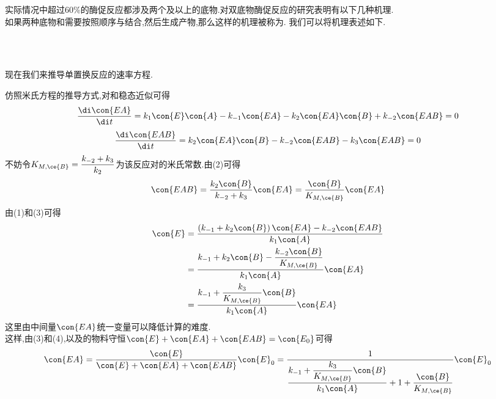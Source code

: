 \documentclass{ctexart}
\begin{document}
\indent 实际情况中超过60\%的酶促反应都涉及两个及以上的底物.对双底物酶促反应的研究表明有以下几种机理.\\
\indent 如果两种底物和需要按照顺序与结合,然后生成产物,那么这样的机理被称为.%
我们可以将机理表述如下.
\begin{tightcenter}
    \\
    \\
\end{tightcenter}
现在我们来推导单置换反应的速率方程.
\begin{derivation}\setcounter{equation}{0}
    仿照米氏方程的推导方式,对和稳态近似可得
    \begin{equation}
        \dfrac{\di\con{EA}}{\di t}=k_1\con{E}\con{A}-k_{-1}\con{EA}-k_2\con{EA}\con{B}+k_{-2}\con{EAB}=0
    \end{equation}
    \begin{equation}
        \dfrac{\di\con{EAB}}{\di t}=k_2\con{EA}\con{B}-k_{-2}\con{EAB}-k_3\con{EAB}=0
    \end{equation}
    不妨令$K_{M,\ce{B}}=\dfrac{k_{-2}+k_3}{k_2}$为该反应对的米氏常数.由(2)可得
    \begin{equation}
        \con{EAB}=\dfrac{k_2\con{B}}{k_{-2}+k_3}\con{EA}=\dfrac{\con{B}}{K_{M,\ce{B}}}\con{EA}
    \end{equation}
    由(1)和(3)可得
    \begin{equation}
        \begin{aligned}
            \con{E}
            &= \dfrac{\left(k_{-1}+k_2\con{B}\right)\con{EA}-k_{-2}\con{EAB}}{k_1\con{A}} \\
            &= \dfrac{k_{-1}+k_2\con{B}-\dfrac{k_{-2}\con{B}}{K_{M,\ce{B}}}}{k_1\con{A}}\con{EA} \\
            &= \dfrac{k_{-1}+\dfrac{k_3}{K_{M,\ce{B}}}\con{B}}{k_1\con{A}}\con{EA}
        \end{aligned}
    \end{equation}
    这里由中间量$\con{EA}$统一变量可以降低计算的难度.\\
    这样,由(3)和(4),以及的物料守恒$\con{E}+\con{EA}+\con{EAB}=\con{E_0}$可得
    \begin{equation}
        \con{EA}
        =\dfrac{\con{E}}{\con{E}+\con{EA}+\con{EAB}}\con{E}_0
        =\dfrac{1}{\dfrac{k_{-1}+\dfrac{k_3}{K_{M,\ce{B}}}\con{B}}{k_1\con{A}}+1+\dfrac{\con{B}}{K_{M,\ce{B}}}}\con{E}_0

\end{equation}
\end{derivation}
\end{document}
